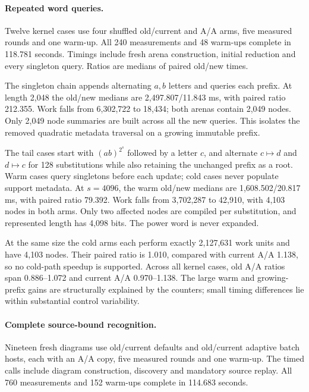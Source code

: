 \paragraph{Repeated word queries.}
Twelve kernel cases use four shuffled old/current and A/A arms, five measured
rounds and one warm-up. All 240 measurements and 48 warm-ups complete in
118.781 seconds. Timings include fresh arena construction, initial reduction
and every singleton query. Ratios are medians of paired old/new times.



The singleton chain appends alternating $a,b$ letters and queries each prefix.
At length 2,048 the old/new medians are 2,497.807/11.843 ms, with paired ratio
212.355. Work falls from 6,302,722 to 18,434; both arenas contain 2,049 nodes.
Only 2,049 node summaries are built across all the new queries. This isolates
the removed quadratic metadata traversal on a growing immutable prefix.

The tail cases start with $(ab)^{2^s}$ followed by a letter $c$, and alternate
$c\mapsto d$ and $d\mapsto c$ for 128 substitutions while also retaining the
unchanged prefix as a root. Warm cases query singletons before each update;
cold cases never populate support metadata. At $s=4096$, the warm old/new
medians are 1,608.502/20.817 ms, with paired ratio 79.392. Work falls from
3,702,287 to 42,910, with 4,103 nodes in both arms. Only two affected nodes
are compiled per substitution, and represented length has 4,098 bits.
The power word is never expanded.

At the same size the cold arms each perform exactly 2,127,631 work units and
have 4,103 nodes. Their paired ratio is 1.010, compared with current A/A
1.138, so no cold-path speedup is supported. Across all kernel cases, old
A/A ratios span 0.886--1.072 and current A/A 0.970--1.138. The large warm
and growing-prefix gains are structurally explained by the counters;
small timing differences lie within substantial control variability.

\paragraph{Complete source-bound recognition.}
Nineteen fresh diagrams use old/current defaults and old/current adaptive
batch hosts, each with an A/A copy, five measured rounds and one warm-up.
The timed calls include diagram construction, discovery and mandatory source
replay. All 760 measurements and 152 warm-ups complete in 114.683 seconds.

